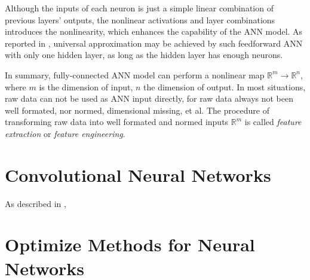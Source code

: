 Although the inputs of each neuron is just a simple linear combination of previous
layers' outputs, the nonlinear activations and layer combinations introduces the
nonlinearity, which enhances the capability of the ANN model. 
As reported in \cite{hornik1989multilayer}, universal approximation may be achieved by
such feedforward ANN with only one hidden layer, as long as the hidden layer has enough neurons.

In summary, fully-connected ANN model can perform a nonlinear map $\mathbb{R}^m \to \mathbb{R}^n$,
where $m$ is the dimension of input, $n$ the dimension of output. In most situations, raw data
can not be used as ANN input directly, for raw data always not been well formated, nor normed, 
dimensional missing, et al.
The procedure of transforming raw data into well formated and normed inputs $\mathbb{R}^m$ is called
\textit{feature extraction} or \textit{feature engineering}.

\section{Convolutional Neural Networks}
As described in \cite{Goodfellow-et-al-2016}, 

\section{Optimize Methods for Neural Networks}
